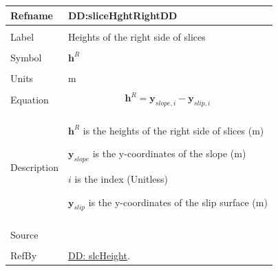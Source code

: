 \documentclass[12pt]{article}
\begin{document}
\noindent \begin{minipage}{\textwidth}
\begin{tabular}{p{} p{}}
\toprule \textbf{Refname} & \textbf{DD:sliceHghtRightDD}
\label{DD:sliceHghtRightDD}
\\ \midrule \\
Label & Heights of the right side of slices
\\ \midrule \\
Symbol & ${\mathbf{h}^{R}}$
\\ \midrule \\
Units & m
\\ \midrule \\
Equation & \begin{displaymath}
           {\mathbf{h}^{R}}={\mathbf{y}_{slope,i}}-{\mathbf{y}_{slip,i}}
           \end{displaymath}
\\ \midrule \\
Description & \begin{symbDescription}
              \item{${\mathbf{h}^{R}}$ is the heights of the right side of slices (m)}
              \item{${\mathbf{y}_{slope}}$ is the y-coordinates of the slope (m)}
              \item{$i$ is the index (Unitless)}
              \item{${\mathbf{y}_{slip}}$ is the y-coordinates of the slip surface (m)}
              \end{symbDescription}
\\ \midrule \\
Source & \cite{fredlund1977}
\\ \midrule \\
RefBy & \hyperref[DD:slcHeight]{DD: slcHeight}.
\\ \bottomrule \end{tabular}
\end{minipage}
\par~
\end{document}

